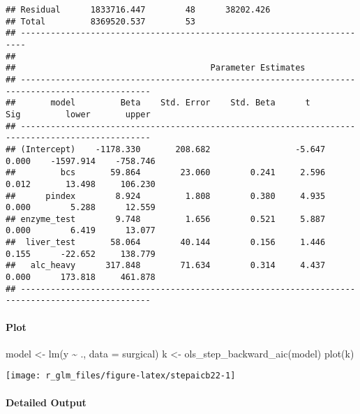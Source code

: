\documentclass[
]{article}
\newenvironment{Shaded}{\begin{snugshade}}{\end{snugshade}}
\newcommand{\AttributeTok}[1]{\textcolor[rgb]{0.77,0.63,0.00}{#1}}
\newcommand{\FunctionTok}[1]{\textcolor[rgb]{0.00,0.00,0.00}{#1}}
\newcommand{\NormalTok}[1]{#1}
\newcommand{\OtherTok}[1]{\textcolor[rgb]{0.56,0.35,0.01}{#1}}
\newcommand{\SpecialCharTok}[1]{\textcolor[rgb]{0.00,0.00,0.00}{#1}}
\begin{document}
\begin{verbatim}
## Residual      1833716.447        48      38202.426                     
## Total         8369520.537        53                                    
## -----------------------------------------------------------------------
## 
##                                       Parameter Estimates                                        
## ------------------------------------------------------------------------------------------------
##       model         Beta    Std. Error    Std. Beta      t        Sig         lower       upper 
## ------------------------------------------------------------------------------------------------
## (Intercept)    -1178.330       208.682                 -5.647    0.000    -1597.914    -758.746 
##         bcs       59.864        23.060        0.241     2.596    0.012       13.498     106.230 
##      pindex        8.924         1.808        0.380     4.935    0.000        5.288      12.559 
## enzyme_test        9.748         1.656        0.521     5.887    0.000        6.419      13.077 
##  liver_test       58.064        40.144        0.156     1.446    0.155      -22.652     138.779 
##   alc_heavy      317.848        71.634        0.314     4.437    0.000      173.818     461.878 
## ------------------------------------------------------------------------------------------------
\end{verbatim}

\hypertarget{plot-6}{%
\paragraph{Plot}\label{plot-6}}

\begin{Shaded}
\begin{Highlighting}[]
\NormalTok{model }\OtherTok{\textless{}{-}} \FunctionTok{lm}\NormalTok{(y }\SpecialCharTok{\textasciitilde{}}\NormalTok{ ., }\AttributeTok{data =}\NormalTok{ surgical)}
\NormalTok{k }\OtherTok{\textless{}{-}} \FunctionTok{ols\_step\_backward\_aic}\NormalTok{(model)}
\FunctionTok{plot}\NormalTok{(k)}
\end{Highlighting}
\end{Shaded}

\begin{center}\texttt{[image: r\_glm\_files/figure-latex/stepaicb22-1]} \end{center}

\hypertarget{detailed-output-4}{%
\paragraph{Detailed Output}\label{detailed-output-4}}
\end{document}
